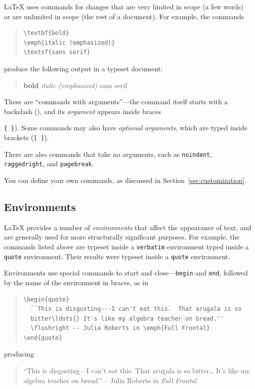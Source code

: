 \documentclass{icmmcm}
\newcommand{\bslash}{\symbol{'134}}%
\newcommand{\bsl}{{\texttt{\bslash}}}
\newcommand{\key}[1]{\textsf{\emph{#1}}\xspace}
\newcommand{\env}[1]{\texttt{#1}\xspace}
\newcommand{\command}[1]{\texttt{\bsl{}#1}\xspace}
\newcommand{\latex}{\LaTeX\xspace}
\begin{document}
\latex uses commands for changes that are very limited in scope (a few
words) or are unlimited in scope (the rest of a document).  For
example, the commands
\begin{quote}
\begin{verbatim}
\textbf{bold} 
\emph{italic (emphasized)} 
\textsf{sans serif}
\end{verbatim}
\end{quote}
produce the following output in a typeset document:
\begin{quote}
\textbf{bold} \emph{italic (emphasized)} \textsf{sans serif}
\end{quote}

These are ``commands with arguments''---the command itself starts with
a backslash (\bsl), and its \key{argument} appears inside braces
{\verb+{ }+).  Some commands may also have \key{optional arguments},
which are typed inside brackets (\verb+[ ]+).

There are also commands that take no arguments, such as
\command{noindent}, \command{raggedright}, and \command{pagebreak}.

You can define your own commands, as discussed in
Section~\ref{sec:customization}.


\subsection{Environments}%
\label{sec:environments}

\latex provides a number of \key{environments} that affect the
appearance of text, and are generally used for more structurally
significant purposes.  For example, the commands listed above are
typeset inside a \env{verbatim} environment typed inside a \env{quote}
environment.  Their results were typeset inside a \env{quote}
environment.

Environments use special commands to start and close---\command{begin}
and \command{end}, followed by the name of the environment in braces,
as in
\begin{quote}
\begin{verbatim}
\begin{quote}
  ``This is disgusting---I can't eat this.  That arugala is so
  bitter\ldots{} It's like my algebra teacher on bread.''
  \flushright -- Julia Roberts in \emph{Full Frontal}
\end{quote}
\end{verbatim}
\end{quote}
producing
\begin{quote}
  ``This is disgusting---I can't eat this.  That arugala is so
  bitter\ldots{} It's like my algebra teacher on bread.''
  \flushright -- Julia Roberts in \emph{Full Frontal}
\end{quote}

}
\end{document}
